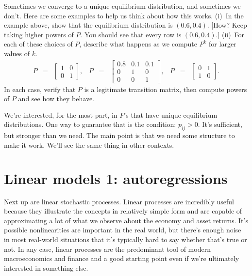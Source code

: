 \documentclass[11pt]{article}
\begin{document}
Sometimes we converge to a unique equilibrium distribution,
and sometimes we don't.
Here are some examples to help us think about how this works.
(i)~In the example above, show that the equilibrium distribution is $ (0.6, 0.4)$.
[How?  Keep taking higher powers of $P$.
You should see that every row is $(0.6, 0.4)$.]
(ii)~For each of these choices of $P$, describe what happens as we compute
$P^k$ for larger values of $k$.
\begin{eqnarray*}
    P &=& \left[
            \begin{array}{cc}
            1 & 0 \\  0 & 1
            \end{array}
            \right], \;\;\;
    P \;\;=\;\; \left[
            \begin{array}{ccc}
            0.8 & 0.1 & 0.1 \\ 0 & 1 & 0 \\ 0 & 0 & 1
            \end{array}
            \right], \;\;\;
    P \;\;=\;\; \left[
            \begin{array}{cc}
            0 & 1 \\  1 & 0
            \end{array}
            \right] .
\end{eqnarray*}
In each case, verify that $P$ is a legitimate transition matrix,
then compute powers of $P$ and see how they behave.

We're interested, for the most part, in $P$'s that have
unique equilibrium distributions.
One way to guarantee that is the condition:  $p_{ij} > 0$.
It's sufficient, but stronger than we need.
The main point is that we need some structure to make it work.
We'll see the same thing in other contexts.


\section{Linear models 1:  autoregressions}
\label{sec:autoregressions}

Next up are linear stochastic processes.
Linear processes are incredibly useful because they illustrate the concepts
in relatively simple form and are capable of approximating
a lot of what we observe about the economy and asset returns.
It's possible nonlinearities are important in the real world,
but there's enough noise in most real-world situations
that it's typically hard to say whether that's true or not.
In any case, linear processes are the predominant tool
of modern macroeconomics and finance and a good starting point even
if we're ultimately interested in something else.
\end{document}
